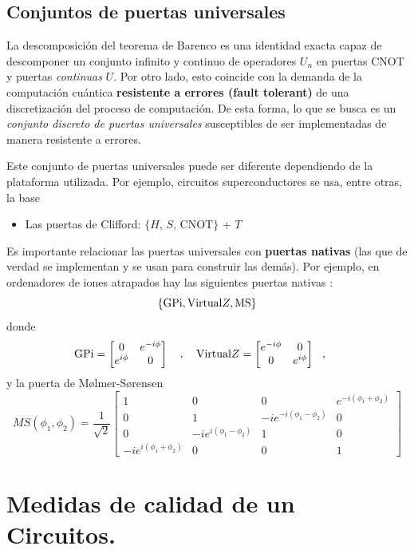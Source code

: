 \documentclass[a4paper,11pt]{book} %
\numberwithin{equation}{chapter}
\begin{document}
        \subsection{Conjuntos de puertas universales}

La descomposición del teorema de Barenco es  una identidad exacta capaz de descomponer un conjunto infinito y continuo de operadores $U_n$ en puertas CNOT y puertas \textit{continuas} $U$. Por otro lado, esto coincide con la demanda de la computación cuántica \textbf{resistente a errores (fault tolerant)} de una discretización del proceso de computación. De esta forma, lo que se busca es un \textit{conjunto discreto de puertas universales} susceptibles de ser implementadas de manera resistente a errores.

Este conjunto de puertas universales puede ser diferente dependiendo de la plataforma utilizada. Por ejemplo, circuitos superconductores se usa, entre otras, la base
	\begin{itemize}
		\item Las puertas de Clifford: $\{ H$, $S$, CNOT$ \}$ + $T$
	\end{itemize}

Es importante relacionar las puertas universales con \textbf{puertas nativas} (las que de verdad se implementan y se usan para construir las demás). Por ejemplo, en ordenadores de iones atrapados hay las siguientes puertas nativas \cite{bib_IONQ}:
$$
\{ \hbox{GPi},\hbox{Virtual}Z, \hbox{MS}\} 
$$
donde 
$$
\hbox{GPi} = \begin{bmatrix} 0 & e^{-i\phi} \\e^{i\phi} & 0 \end{bmatrix}~~~,~~~
\hbox{Virtual}Z = \begin{bmatrix} e^{-i\phi} & 0 \\ 0 & e^{i\phi} \end{bmatrix} ~~,~~~~
$$
y la puerta de Mølmer-Sørensen
$$
MS(\phi_1,\phi_2) = \frac{1}{\sqrt{2}}
\begin{bmatrix}
1 & 0 & 0 & e^{-i(\phi_1+\phi_2)} \\ 0 & 1 &-i e^{-i(\phi_1-\phi_2)} & 0 \\ 0 & -i e^{i(\phi_1-\phi_2)} & 1 & 0  \\ 
-ie^{i(\phi_1+\phi_2)} & 0 & 0 & 1 
\end{bmatrix}
$$

    \section{Medidas de calidad de un Circuitos.}
\end{document}
